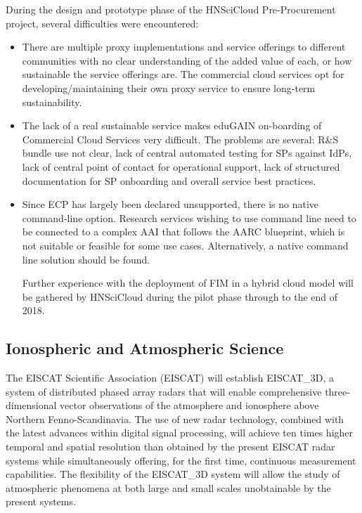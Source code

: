 \documentclass[fleqn,11pt]{wlscirep}
\begin{document}
{During the design and prototype phase of the HNSciCloud Pre-Procurement project, several difficulties were encountered:
\begin{itemize}
\item There are multiple proxy implementations and service offerings to different communities with no clear understanding of the added value of each, or how sustainable the service offerings are. The commercial cloud services opt for developing/maintaining their own proxy service to ensure long-term sustainability.  
\item The lack of a real sustainable service makes eduGAIN on-boarding of Commercial Cloud Services very difficult. The problems are several: R\&S bundle use not clear, lack of central automated testing for SPs against IdPs, lack of central point of contact for operational support, lack of structured documentation for SP onboarding and overall service best practices.
\item Since ECP has largely been declared unsupported, there is no native command-line option. Research services wishing to use command line need to be connected to a complex AAI that follows the AARC blueprint, which is not suitable or feasible for some use cases. Alternatively, a native command line solution should be found.

Further experience with the deployment of FIM in a hybrid cloud model will be gathered by HNSciCloud during the pilot phase through to the end of 2018. 

\end{itemize}

\subsection{Ionospheric and Atmospheric Science}
The EISCAT Scientific Association (EISCAT) will establish EISCAT\_3D, a system of distributed phased array radars that will enable comprehensive three-dimensional vector observations of the atmosphere and ionosphere above Northern Fenno-Scandinavia. The use of new radar technology, combined with the latest advances within digital signal processing, will achieve ten times higher temporal and spatial resolution than obtained by the present EISCAT radar systems while simultaneously offering, for the first time, continuous measurement capabilities. The flexibility of the EISCAT\_3D system will allow the study of atmospheric phenomena at both large and small scales unobtainable by the present systems.

}
\end{document}
